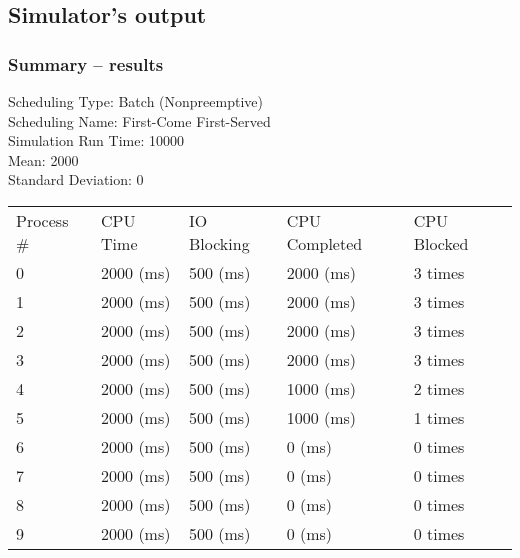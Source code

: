 \documentclass{article}
\begin{document}
\subsection{Simulator's output}
\subsubsection*{Summary -- results}
\ttfamily
Scheduling Type: Batch (Nonpreemptive)\\
Scheduling Name: First-Come First-Served\\
Simulation Run Time: 10000\\
Mean: 2000\\
Standard Deviation: 0\\
\begin{tabular}{@{}l l l l l}
    Process \#&	CPU Time&	IO Blocking&	CPU Completed&	CPU Blocked\\
    0		&2000 (ms)	&500 (ms)	&2000 (ms)	&3 times\\
    1		&2000 (ms)	&500 (ms)	&2000 (ms)	&3 times\\
    2		&2000 (ms)	&500 (ms)	&2000 (ms)	&3 times\\
    3		&2000 (ms)	&500 (ms)	&2000 (ms)	&3 times\\
    4		&2000 (ms)	&500 (ms)	&1000 (ms)	&2 times\\
    5		&2000 (ms)	&500 (ms)	&1000 (ms)	&1 times\\
    6		&2000 (ms)	&500 (ms)	&0 (ms)		&0 times\\
    7		&2000 (ms)	&500 (ms)	&0 (ms)		&0 times\\
    8		&2000 (ms)	&500 (ms)	&0 (ms)		&0 times\\
    9		&2000 (ms)	&500 (ms)	&0 (ms)		&0 times
\end{tabular}
\end{document}
